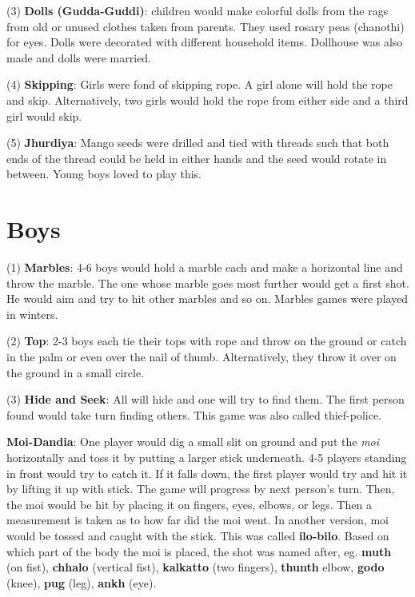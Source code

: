 (3) \textbf{Dolls (Gudda-Guddi)}: children would make colorful dolls from the
rags from old or unused clothes taken from parents. They used rosary peas
(chanothi) for eyes. Dolls were decorated with different household items.
Dollhouse was also made and dolls were married. 

(4) \textbf{Skipping}: Girls were fond of skipping rope. A girl alone will hold
the rope and skip. Alternatively, two girls would hold the rope from either side
and a third girl would skip. 

(5) \textbf{Jhurdiya}: Mango seeds were drilled and tied with threads such that
both ends of the thread could be held in either hands and the seed would rotate
in between. Young boys loved to play this.


\section{Boys}

(1) \textbf{Marbles}: 4-6 boys would hold a marble each and make a horizontal
line and throw the marble. The one whose marble goes most further would get a
first shot. He would aim and try to hit other marbles and so on. Marbles games
were played in winters.

(2) \textbf{Top}: 2-3 boys each tie their tops with rope and throw on the
ground or catch in the palm or even over the nail of thumb. Alternatively, they
throw it over on the ground in a small circle.

(3) \textbf{Hide and Seek}: All will hide and one will try to find them. The
first person found would take turn finding others. This game was also called
thief-police.

\textbf{Moi-Dandia}: One player would dig a small slit on ground and put the
\textit{moi} horizontally and toss it by putting a larger stick underneath. 4-5
players standing in front would try to catch it. If it falls down, the first
player would try and hit it by lifting it up with stick. The game will progress
by next person's turn. Then, the moi would be hit by placing it on fingers,
eyes, elbows, or legs. Then a measurement is taken as to how far did the moi
went. In another version, moi would be tossed and caught with the stick. This
was called \textbf{ilo-bilo}. Based on which part of the body the moi is
placed, the shot was named after, eg. \textbf{muth} (on fist), \textbf{chhalo}
(vertical fist), \textbf{kalkatto} (two fingers), \textbf{thunth} {elbow},
\textbf{godo} (knee), \textbf{pug} (leg), \textbf{ankh} (eye).

